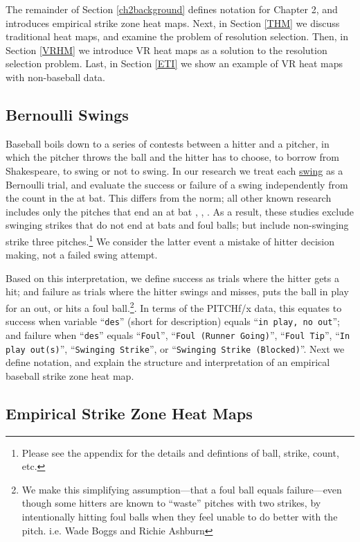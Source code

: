 The remainder of Section \ref{ch2background} defines notation for Chapter 2, and introduces empirical strike zone heat maps. Next, in Section \ref{THM} we discuss traditional heat maps, and examine the problem of resolution selection. Then, in Section \ref{VRHM} we introduce VR heat maps as a solution to the resolution selection problem. Last, in Section \ref{ETI} we show an example of VR heat maps with non-baseball data.

\subsection{Bernoulli Swings}

Baseball boils down to a series of contests between a hitter and a pitcher, in which the pitcher throws the ball and the hitter has to choose, to borrow from Shakespeare, to swing or not to swing. In our research we treat each \underline{swing} as a Bernoulli trial, and evaluate the success or failure of a swing independently from the count in the at bat. This differs from the norm; all other known research includes only the pitches that end an at bat \citep{Cross2015}, \citep{Baumer2010}, \citep{Fast2011}. As a result, these studies exclude swinging strikes that do not end at bats and foul balls; but include non-swinging strike three pitches.\footnote{Please see the appendix for the details and defintions of ball, strike, count, etc.} We consider the latter event a mistake of hitter decision making, not a failed swing attempt. 

Based on this interpretation, we define success as trials where the hitter gets a hit; and failure as trials where the hitter swings and misses, puts the ball in play for an out, or hits a foul ball.\footnote{We make this simplifying assumption---that a foul ball equals failure---even though some hitters are known to ``waste'' pitches with two strikes, by intentionally hitting foul balls when they feel unable to do better with the pitch. i.e. Wade Boggs and Richie Ashburn}. In terms of the PITCHf/x\textsuperscript{\textregistered} data, this equates to success when variable ``\verb|des|'' (short for description)  equals ``\verb|in play, no out|''; and failure when ``\verb|des|'' equals ``\verb|Foul|'', ``\verb|Foul (Runner Going)|'', ``\verb|Foul Tip|'', ``\verb|In play out(s)|'', ``\verb|Swinging Strike|'', or ``\verb|Swinging Strike (Blocked)|''. Next we define notation, and explain the structure and interpretation of an empirical baseball strike zone heat map.

\subsection{Empirical Strike Zone Heat Maps}

